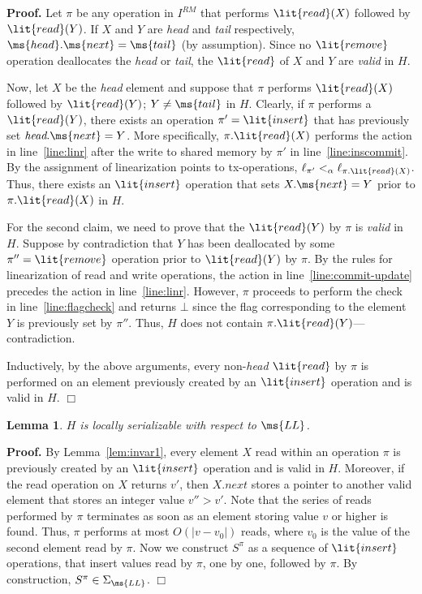 \documentclass[11pt,pdftex,letterpaper]{article}
\newtheorem{lemma}[theorem]{Lemma}
\newenvironment{proof}[1][Proof]{\noindent\textbf{#1.} }{\hfill $\Box$\\[2mm]}
\newcommand{\LL}{\ms{LL}}
\begin{document}
\begin{proof} 
Let $\pi$ be any operation in $I^{RM}$ that performs $\lit{read}(X)$ followed by $\lit{read}(Y)$.
If $X$ and $Y$ are \emph{head} and \emph{tail} respectively, $\ms{head}.\ms{next}=\ms{tail}$ (by assumption). Since no $\lit{remove}$ operation
deallocates the \emph{head} or \emph{tail}, the $\lit{read}$ of $X$ and $Y$ are \emph{valid} in $H$.

Now, let $X$ be the \emph{head} element and suppose that $\pi$ performs $\lit{read}(X)$ followed by $\lit{read}(Y)$; $Y\neq \ms{tail}$ in $H$.
Clearly, if $\pi$ performs a $\lit{read}(Y)$, there exists an
operation $\pi'=\lit{insert}$ that has previously set $\emph{head}.\ms{next}=Y$.
More specifically, $\pi.\lit{read}(X)$ performs the action in line~\ref{line:linr} after the
write to shared memory by $\pi'$ in line~\ref{line:inscommit}. 
By the assignment of linearization points to tx-operations, $\ell_{\pi'} <_{\alpha} \ell_{\pi.\lit{read}(X)}$.
Thus, there exists an $\lit{insert}$ operation that sets $X.\ms{next}=Y$ prior to $\pi.\lit{read}(X)$ in $H$.

For the second claim, we need to prove that the $\lit{read}(Y)$ by $\pi$ is \emph{valid} in $H$.
Suppose by contradiction that $Y$ has been deallocated by some $\pi''=\lit{remove}$ operation prior to $\lit{read}(Y)$ by $\pi$.
By the rules for linearization of read and write operations, the action in line~\ref{line:commit-update} precedes the action in line~\ref{line:linr}.
However, $\pi$ proceeds to perform the check in line~\ref{line:flagcheck} and returns $\bot$ since the flag corresponding to the element $Y$ is previously set by $\pi''$. Thus, $H$ does not contain $\pi.\lit{read}(Y)$---contradiction.


Inductively, by the above arguments, every non-\emph{head} $\lit{read}$ by $\pi$ 
is performed on an element previously created by an $\lit{insert}$ operation
and is valid in $H$.
\end{proof} 
\begin{lemma}
\label{lem:rls}
$H$ is locally serializable with respect to $\LL$.
\end{lemma}
\begin{proof}
By Lemma~\ref{lem:invar1}, every element $X$ read 
within an operation $\pi$ 
is previously created by an $\lit{insert}$ operation and is valid in $H$.
Moreover, if the read operation on $X$ returns $v'$, then 
$X.\textit{next}$ stores a pointer to another valid element that
stores an integer value $v''>v'$.
Note that the series of reads performed by $\pi$ terminates as soon as 
an element storing value $v$ or higher is found. Thus, $\pi$ performs at most
$O(|v-v_0|)$ reads, where $v_0$ is the value of the second element read by $\pi$.  
Now we construct $S^{\pi}$ as a sequence of $\lit{insert}$ operations,
that insert values read by $\pi$, one by one, followed by $\pi$. 
By construction, $S^{\pi}\in\Sigma_{\ms{LL}}$.
\end{proof}
\end{document}
